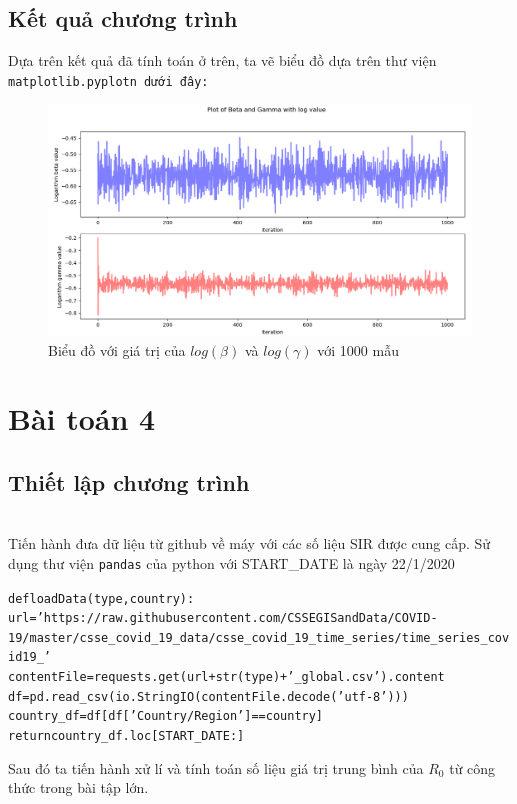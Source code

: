 \documentclass[a4paper]{article}
\begin{document}
\begin{enumerate}
\subsection{Kết quả chương trình}
Dựa trên kết quả đã tính toán ở trên, ta vẽ biểu đồ dựa trên thư viện {\tt matplotlib.pyplotn dưới đây:}\\
\begin{figure}[h]\caption{Biểu đồ với giá trị của $log(\beta)$ và $log(\gamma)$ với 1000 mẫu\\} \label{graph3}
\begin{center}
\includegraphics[scale=0.3]{Images/graph3.png}
\end{center}
\end{figure}

\end{enumerate}
\section{Bài toán 4}
\subsection{Thiết lập chương trình}\\
Tiến hành đưa dữ liệu từ github về máy với các số liệu SIR được cung cấp. Sử dụng thư viện {\tt pandas} của python với START\_DATE là ngày 22/1/2020
   	 \begin{mdframed}[hidealllines=true,backgroundcolor=magenta!10]
	 \begin{alltt}
def loadData(type, country):
    url = 'https://raw.githubusercontent.com/CSSEGISandData/COVID-19/master/csse_covid_19_data/csse_covid_19_time_series/time_series_covid19_'
    contentFile = requests.get(url + str(type) + '_global.csv').content
    df = pd.read_csv(io.StringIO(contentFile.decode('utf-8')))
    country_df = df[df['Country/Region'] == country]
    return country_df.loc[START_DATE:]
	 \end{alltt}
	 \end{mdframed}
Sau đó ta tiến hành xử lí và tính toán số liệu giá trị trung bình của $R_{0}$ từ công thức trong bài tập lớn.
\end{document}
